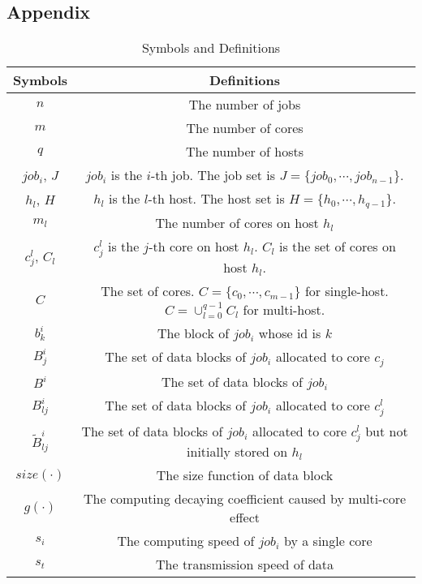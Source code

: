 \documentclass{llncs}
\begin{document}
%
%
%
%
% 
%

\begin{appendices}
\section*{Appendix}

\begin{table}[htbp]
\caption{Symbols and Definitions}
\begin{center}
\begin{tabular}{c|c}
\toprule
\textbf{Symbols} &\textbf{Definitions}  \\
\midrule
$n$ & The number of jobs  \\
$m$ & The number of cores \\
$q$ & The number of hosts  \\
$job_i$, $J$ & $job_i$ is the $i$-th job. The job set is $J=\{job_0, \cdots, job_{n-1}\}$. \\
$h_l$, $H$ & $h_l$ is the $l$-th  host. The host set is $H=\{h_0, \cdots, h_{q-1}\}$. \\
$m_l$ & The number of cores on host $h_l$\\
$c^l_j$, $C_l$ & $c^l_j$ is the $j$-th core on host $h_l$. $C_l$ is the set of cores on host $h_l$.\\
$C$ & The set of cores. $C=\{c_0,\cdots,c_{m-1}\}$ for single-host. $C=\cup_{l=0}^{q-1} C_l$ for multi-host.\\
$b^i_k$& The block of $job_i$ whose id is $k$\\
$B^i_{j}$ & The set of data blocks of $job_i$ allocated to core $c_j$ \\
$B^i$ & The set of data blocks of $job_i$ \\
$B^i_{lj}$ & The set of data blocks of $job_i$ allocated to core $c^l_j$ \\
$\widetilde{B}^i_{lj}$ & The set of data blocks of $job_i$ allocated to core $c^l_j$ but not initially stored on $h_l$\\
$size(\cdot)$ & The size function of data block\\
$g(\cdot)$ &  The computing decaying coefficient caused by multi-core effect\\
$s_i$ & The computing speed of $job_i$ by a single core\\
$s_t$ & The transmission speed of data \\

\end{tabular}
\end{center}
\end{table}
\end{appendices}
\end{document}
